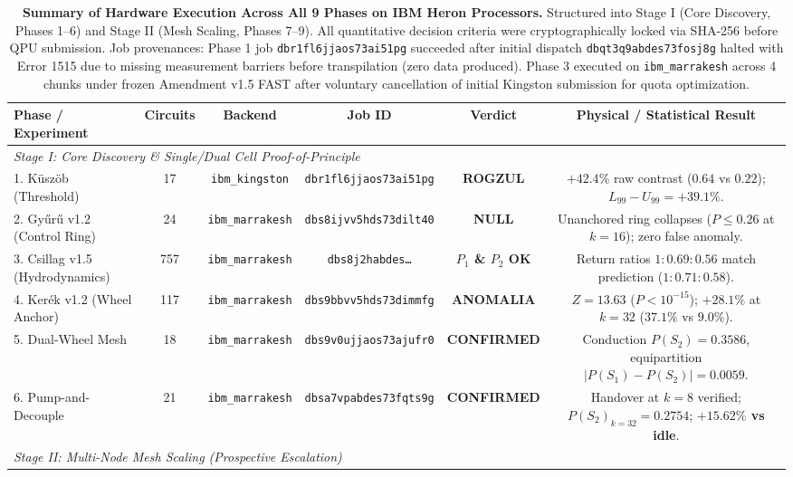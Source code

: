 \documentclass[aps,pra,twocolumn,superscriptaddress,floatfix,10pt]{revtex4-2}
\begin{document}
\begin{table}[t]
\caption{\textbf{Summary of Hardware Execution Across All 9 Phases on IBM Heron Processors.} Structured into Stage I (Core Discovery, Phases 1--6) and Stage II (Mesh Scaling, Phases 7--9). All quantitative decision criteria were cryptographically locked via SHA-256 before QPU submission. Job provenances: Phase 1 job \texttt{dbr1fl6jjaos73ai51pg} succeeded after initial dispatch \texttt{dbqt3q9abdes73fosj8g} halted with Error 1515 due to missing measurement barriers before transpilation (zero data produced). Phase 3 executed on \texttt{ibm\_marrakesh} across 4 chunks under frozen Amendment v1.5 FAST after voluntary cancellation of initial Kingston submission for quota optimization.}
\label{tab:results}
\begin{ruledtabular}
\begin{tabular}{lccccc}
Phase / Experiment & Circuits & Backend & Job ID & Verdict & Physical / Statistical Result \\
\hline
\multicolumn{6}{l}{\textit{Stage I: Core Discovery \& Single/Dual Cell Proof-of-Principle}} \\
1. Küszöb (Threshold) & 17 & \texttt{ibm\_kingston} & \texttt{dbr1fl6jjaos73ai51pg} & \textbf{ROGZUL} & $+42.4\%$ raw contrast ($0.64$ vs $0.22$); $L_{99}-U_{99} = +39.1\%$. \\
2. Gyűrű v1.2 (Control Ring) & 24 & \texttt{ibm\_marrakesh} & \texttt{dbs8ijvv5hds73dilt40} & \textbf{NULL} & Unanchored ring collapses ($P \le 0.26$ at $k=16$); zero false anomaly. \\
3. Csillag v1.5 (Hydrodynamics) & 757 & \texttt{ibm\_marrakesh} & \texttt{dbs8j2habdes\dots} & \textbf{$P_1$ \& $P_2$ OK} & Return ratios $1:0.69:0.56$ match prediction ($1:0.71:0.58$). \\
4. Kerék v1.2 (Wheel Anchor) & 117 & \texttt{ibm\_marrakesh} & \texttt{dbs9bbvv5hds73dimmfg} & \textbf{ANOMALIA} & $Z = 13.63$ ($P < 10^{-15}$); $+28.1\%$ at $k=32$ ($37.1\%$ vs $9.0\%$). \\
5. Dual-Wheel Mesh & 18 & \texttt{ibm\_marrakesh} & \texttt{dbs9v0ujjaos73ajufr0} & \textbf{CONFIRMED} & Conduction $P(S_2)=0.3586$, equipartition $|P(S_1)-P(S_2)|=0.0059$. \\
6. Pump-and-Decouple & 21 & \texttt{ibm\_marrakesh} & \texttt{dbsa7vpabdes73fqts9g} & \textbf{CONFIRMED} & Handover at $k=8$ verified; $P(S_2)_{k=32} = 0.2754$; \textbf{$+15.62\%$ vs idle}. \\
\hline
\multicolumn{6}{l}{\textit{Stage II: Multi-Node Mesh Scaling (Prospective Escalation)}} \\

\end{tabular}
\end{ruledtabular}
\end{table}
\end{document}
